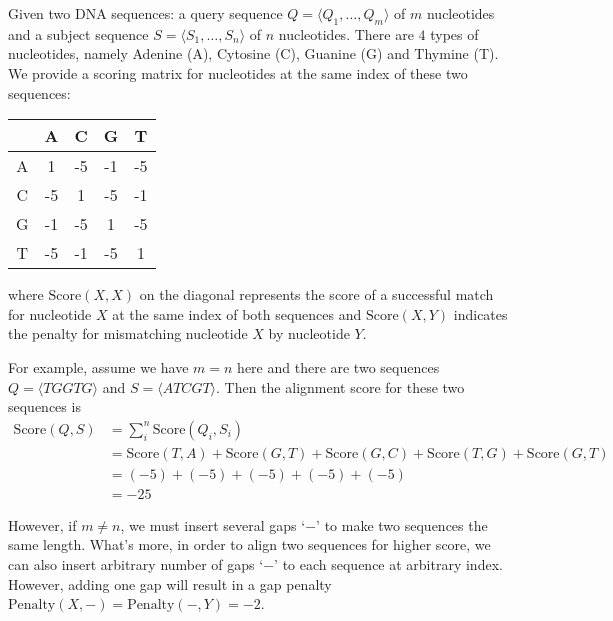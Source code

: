 
Given two DNA sequences: a query sequence $Q=\langle Q_1, \dots, Q_m\rangle$ of $m$ nucleotides and a subject sequence $S=\langle S_1, \dots, S_n\rangle$ of $n$ nucleotides. There are $4$ types of nucleotides, namely Adenine (A), Cytosine (C), Guanine (G) and Thymine (T). We provide a scoring matrix for nucleotides at the same index of these two sequences:

\begin{table}[!htbp]
	\centering
	\begin{tabular}{|c|c|c|c|c|} \hline
		  & A  & C  & G  & T  \\ \hline
		A & 1  & -5 & -1 & -5 \\ \hline
		C & -5 & 1  & -5 & -1 \\ \hline
		G & -1 & -5 & 1  & -5 \\ \hline
		T & -5 & -1 & -5 & 1  \\ \hline
	\end{tabular}
\end{table}

where $\text{Score}(X, X)$ on the diagonal represents the score of a successful match for nucleotide $X$ at the same index of both sequences and  $\text{Score}(X, Y)$ indicates the penalty for mismatching nucleotide $X$ by nucleotide $Y$.

For example, assume we have $m=n$ here and there are two sequences $Q=\langle TGGTG\rangle$ and $S=\langle ATCGT\rangle$. Then the alignment score for these two sequences is
\[
	\begin{aligned}
		\text{Score}(Q, S) & = \sum_{i}^{n} \text{Score}(Q_i, S_i) \\
		                   & = \text{Score}(T, A)+\text{Score}(G, T)+\text{Score}(G, C)+\text{Score}(T, G)+\text{Score}(G, T) \\
		                   & = (-5)+(-5)+(-5)+(-5)+(-5) \\
		                   & = -25
	\end{aligned}
\]

However, if $m \neq n$, we must insert several gaps `$-$' to make two sequences the same length. What's more, in order to align two sequences for higher score, we can also insert arbitrary number of gaps `$-$' to each sequence at arbitrary index. However, adding one gap will result in a gap penalty $\text{Penalty}(X, -)=\text{Penalty}(-, Y)=-2$.

